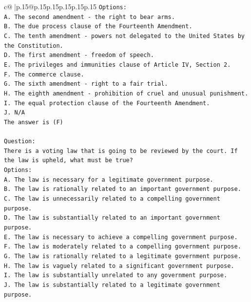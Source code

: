 \documentclass{article}
\begin{document}
{\begin{supertabular}{c@{$\;$}|p{.15\linewidth}@{}p{.15\linewidth}p{.15\linewidth}p{.15\linewidth}p{.15\linewidth}p{.15\linewidth}}
{{{\texttt{Options:} \\
\texttt{A. The second amendment {-} the right to bear arms.} \\
\texttt{B. The due process clause of the Fourteenth Amendment.} \\
\texttt{C. The tenth amendment {-} powers not delegated to the United States by the Constitution.} \\
\texttt{D. The first amendment {-} freedom of speech.} \\
\texttt{E. The privileges and immunities clause of Article IV, Section 2.} \\
\texttt{F. The commerce clause.} \\
\texttt{G. The sixth amendment {-} right to a fair trial.} \\
\texttt{H. The eighth amendment {-} prohibition of cruel and unusual punishment.} \\
\texttt{I. The equal protection clause of the Fourteenth Amendment.} \\
\texttt{J. N/A} \\
\texttt{The answer is (F)} \\
\\ 
\texttt{Question:} \\
\texttt{There is a voting law that is going to be reviewed by the court. If the law is upheld, what must be true?} \\
\texttt{Options:} \\
\texttt{A. The law is necessary for a legitimate government purpose.} \\
\texttt{B. The law is rationally related to an important government purpose.} \\
\texttt{C. The law is unnecessarily related to a compelling government purpose.} \\
\texttt{D. The law is substantially related to an important government purpose.} \\
\texttt{E. The law is necessary to achieve a compelling government purpose.} \\
\texttt{F. The law is moderately related to a compelling government purpose.} \\
\texttt{G. The law is rationally related to a legitimate government purpose.} \\
\texttt{H. The law is vaguely related to a significant government purpose.} \\
\texttt{I. The law is substantially unrelated to any government purpose.} \\
\texttt{J. The law is substantially related to a legitimate government purpose.} \\
            }
        }
    }
     \\ \\


\end{supertabular}}
\end{document}
